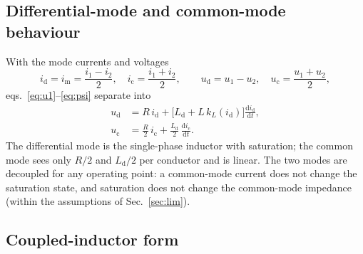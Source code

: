 \documentclass[11pt,a4paper]{article}
\begin{document}
\subsection{Differential-mode and common-mode behaviour}

With the mode currents and voltages
\begin{equation}
  i_\mathrm{d} = i_\mathrm{m} = \frac{i_1 - i_2}{2}, \quad
  i_\mathrm{c} = \frac{i_1 + i_2}{2}, \qquad
  u_\mathrm{d} = u_1 - u_2, \quad
  u_\mathrm{c} = \frac{u_1 + u_2}{2},
\end{equation}
eqs.~\eqref{eq:u1}--\eqref{eq:psi} separate into
\begin{align}
  u_\mathrm{d} &= R\, i_\mathrm{d} + \bigl[L_\mathrm{d} + L\, k_L(i_\mathrm{d})\bigr]
                  \frac{\mathrm{d}i_\mathrm{d}}{\mathrm{d}t}, \label{eq:dm}\\
  u_\mathrm{c} &= \frac{R}{2}\, i_\mathrm{c} + \frac{L_\mathrm{d}}{2}\,
                  \frac{\mathrm{d}i_\mathrm{c}}{\mathrm{d}t}. \label{eq:cm}
\end{align}
The differential mode is the single-phase inductor with saturation; the common mode sees
only $R/2$ and $L_\mathrm{d}/2$ per conductor and is linear. The two modes are decoupled
for any operating point: a common-mode current does not change the saturation state, and
saturation does not change the common-mode impedance (within the assumptions of
Sec.~\ref{sec:lim}).

\subsection{Coupled-inductor form}
\end{document}
